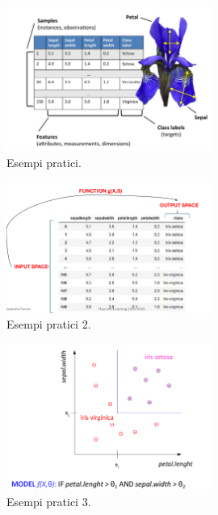 \begin{figure}[H]
	\centering
	\includegraphics[width=0.6\textwidth]{pictures/esempioDefinizioni.png}
	\caption{Esempi pratici.}
\end{figure}
\begin{figure}[H]
	\centering
	\includegraphics[width=0.6\textwidth]{pictures/esempioDefinizioni2.png}
	\caption{Esempi pratici 2.}
\end{figure}
\begin{figure}[H]
	\centering
	\includegraphics[width=0.6\textwidth]{pictures/esempioDefinizioni3.png}
	\caption{Esempi pratici 3.}
\end{figure}
